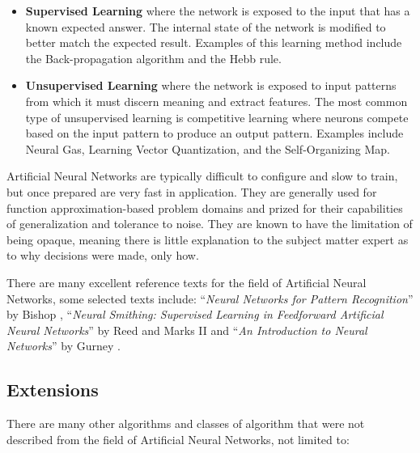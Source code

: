 \begin{bibunit}
\begin{itemize}
	\item \textbf{Supervised Learning} where the network is exposed to the input that has a known expected answer. The internal state of the network is modified to better match the expected result. Examples of this learning method include the Back-propagation algorithm and the Hebb rule.
	\item \textbf{Unsupervised Learning} where the network is exposed to input patterns from which it must discern meaning and extract features. The most common type of unsupervised learning is competitive learning where neurons compete based on the input pattern to produce an output pattern. Examples include Neural Gas, Learning Vector Quantization, and the Self-Organizing Map.
\end{itemize}

Artificial Neural Networks are typically difficult to configure and slow to train, but once prepared are very fast in application. They are generally used for function approximation-based problem domains and prized for their capabilities of generalization and tolerance to noise. They are known to have the limitation of being opaque, meaning there is little explanation to the subject matter expert as to why decisions were made, only how.



There are many excellent reference texts for the field of Artificial Neural Networks, some selected texts include: ``\emph{Neural Networks for Pattern Recognition}'' by Bishop \cite{Bishop1995}, ``\emph{Neural Smithing: Supervised Learning in Feedforward Artificial Neural Networks}'' by Reed and Marks II \cite{Reed1999} and ``\emph{An Introduction to Neural Networks}'' by Gurney \cite{Gurney1997}.


% 
% 
\subsection{Extensions}
There are many other algorithms and classes of algorithm that were not described from the field of Artificial Neural Networks, not limited to:


\end{bibunit}
